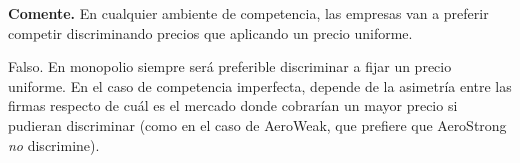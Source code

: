 \question \textbf{Comente.} En cualquier ambiente de competencia, las empresas van a preferir competir discriminando precios que aplicando un precio uniforme.
\begin{solution}
Falso. En monopolio siempre será preferible discriminar a fijar un precio uniforme. En el caso de competencia imperfecta, depende de la asimetría entre las firmas respecto de cuál es el mercado donde cobrarían un mayor precio si pudieran discriminar (como en el caso de AeroWeak, que prefiere que AeroStrong \emph{no} discrimine).

\end{solution}

